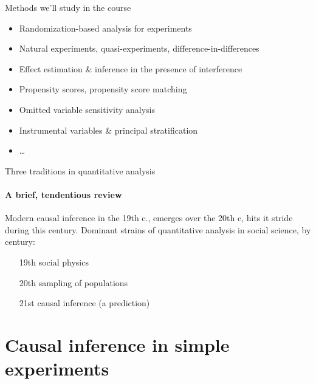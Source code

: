 


\begin{frame}[label=whatWeWillCoverFr]{Methods we'll study in the course}
  \begin{itemize}
  \item Randomization-based analysis for experiments
  \item Natural experiments, quasi-experiments,
    difference-in-differences
  \item Effect estimation \& inference in the presence of interference
  \item Propensity scores, propensity score matching
  \item Omitted variable sensitivity analysis
  \item Instrumental variables \& principal stratification
  \item \ldots
  \end{itemize}
\end{frame}


\begin{frame}{Three traditions in quantitative analysis}
\framesubtitle{A brief, tendentious review}

Modern causal inference in the 19th c., emerges over the 20th c, hits
it stride during this century. Dominant strains of quantitative
analysis in social science, by century:

\begin{itemize}
\item[19th] social physics
\item[20th] sampling of populations
\item[21st] causal inference (a prediction)
\end{itemize}

  
\end{frame}

\section{Causal inference in simple experiments}

